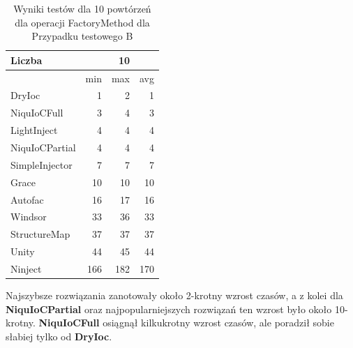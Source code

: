 \documentclass[12pt]{article}
\begin{document}
\begin{table}[H]
\captionsetup{belowskip=0pt,aboveskip=0pt}
\begin{center}
\begin{small}
	\begin{tabular}{ | l | r r r | }
    		\hline
Liczba & & 10 & \\ \hline
 & min & max & avg \\ \hline
DryIoc & 1 & 2 & 1 \\ \hline
NiquIoCFull & 3 & 4 & 3 \\ \hline
LightInject & 4 & 4 & 4 \\ \hline
NiquIoCPartial & 4 & 4 & 4 \\ \hline
SimpleInjector & 7 & 7 & 7 \\ \hline
Grace & 10 & 10 & 10 \\ \hline
Autofac & 16 & 17 & 16 \\ \hline
Windsor & 33 & 36 & 33 \\ \hline
StructureMap & 37 & 37 & 37 \\ \hline
Unity & 44 & 45 & 44 \\ \hline
Ninject & 166 & 182 & 170 \\ \hline
  	\end{tabular}
\end{small}
\end{center}
\caption{Wyniki testów dla 10 powtórzeń dla operacji FactoryMethod dla Przypadku testowego B}
\label{TestCaseB_FactoryMethod10}
\end{table}
Najszybsze rozwiązania zanotowały około 2-krotny wzrost czasów, a z kolei dla \textbf{NiquIoCPartial} oraz najpopularniejszych rozwiązań ten wzrost było około 10-krotny. \textbf{NiquIoCFull} osiągnął kilkukrotny wzrost czasów, ale poradził sobie słabiej tylko od \textbf{DryIoc}.
\\ \\
\end{document}

